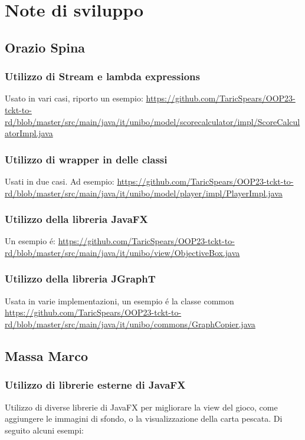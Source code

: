 \documentclass[a4paper,12pt]{report}
\begin{document}
\section{Note di sviluppo}

\subsection{Orazio Spina}
\subsubsection{Utilizzo di Stream e lambda expressions}
Usato in vari casi, riporto un esempio: \url{https://github.com/TaricSpears/OOP23-tckt-to-rd/blob/master/src/main/java/it/unibo/model/scorecalculator/impl/ScoreCalculatorImpl.java}

\subsubsection{Utilizzo di wrapper in delle classi}
Usati in due casi. Ad esempio: \url{https://github.com/TaricSpears/OOP23-tckt-to-rd/blob/master/src/main/java/it/unibo/model/player/impl/PlayerImpl.java}

\subsubsection{Utilizzo della libreria JavaFX}
Un esempio é: \url{https://github.com/TaricSpears/OOP23-tckt-to-rd/blob/master/src/main/java/it/unibo/view/ObjectiveBox.java}

\subsubsection{Utilizzo della libreria JGraphT}
Usata in varie implementazioni, un esempio é la classe common \url{https://github.com/TaricSpears/OOP23-tckt-to-rd/blob/master/src/main/java/it/unibo/commons/GraphCopier.java}
\newpage
\subsection{Massa Marco}
\subsubsection{Utilizzo di librerie esterne di JavaFX}
Utilizzo di diverse librerie di JavaFX per migliorare la view del gioco, come aggiungere le immagini di sfondo, o la visualizzazione della carta pescata. Di seguito alcuni esempi:
\end{document}
